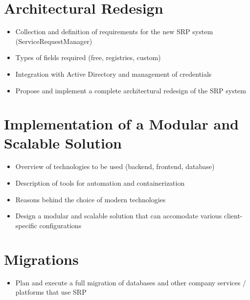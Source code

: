 \documentclass[a4paper, oneside, openright]{book}
\begin{document}
\tableofcontents  %
\newpage %
\setcounter{chapter}{-1} %
% 
% 






\chapter{Architectural Redesign}
\begin{itemize}
    \item Collection and definition of requirements for the new SRP system (ServiceRequestManager)
    \item Types of fields required (free, registries, custom)
    \item Integration with Active Directory and management of credentials
    \item Propose and implement a complete architectural redesign of the SRP system
\end{itemize}

\chapter{Implementation of a Modular and Scalable Solution}
\begin{itemize}
    \item Overview of technologies to be used (backend, frontend, database)
    \item Description of tools for automation and containerization
    \item Reasons behind the choice of modern technologies
    \item Design a modular and scalable solution that can accomodate various client-specific configurations
\end{itemize}

\chapter{Migrations}
\begin{itemize}
    \item Plan and execute a full migration of databases and other company services / platforms that use SRP
\end{itemize}
\end{document}
